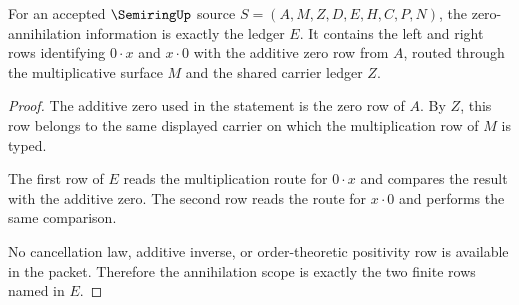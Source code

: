 \begin{theorem}
\label{thm:semiring-zero-annihilation-scope}
For an accepted $\SemiringUp$ source
$S=(A,M,Z,D,E,H,C,P,N)$, the zero-annihilation information is exactly the
ledger $E$. It contains the left and right rows identifying $0\cdot x$ and
$x\cdot 0$ with the additive zero row from $A$, routed through the
multiplicative surface $M$ and the shared carrier ledger $Z$.
\end{theorem}
\begin{proof}
The additive zero used in the statement is the zero row of $A$. By $Z$, this
row belongs to the same displayed carrier on which the multiplication row of
$M$ is typed.

The first row of $E$ reads the multiplication route for $0\cdot x$ and
compares the result with the additive zero. The second row reads the route for
$x\cdot 0$ and performs the same comparison.

No cancellation law, additive inverse, or order-theoretic positivity row is
available in the packet. Therefore the annihilation scope is exactly the two
finite rows named in $E$.
\end{proof}

